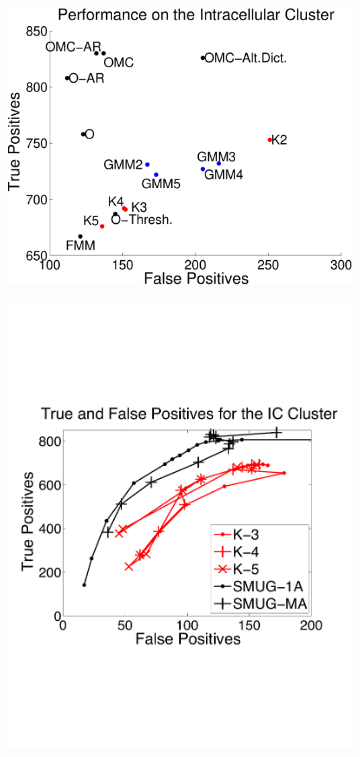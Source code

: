  
\begin{center}
\begin{figure}
\begin{subfigure}[b]{.49\textwidth}
\centering
\includegraphics[width=\textwidth]{../figs/truefalsepositive.pdf}
\caption{}
\label{hc1res}
\end{subfigure}
\begin{subfigure}[b]{.49\textwidth}
\includegraphics[width=\textwidth]{../figs/new/icroc.pdf}

\end{subfigure}
\end{figure}
\end{center}
